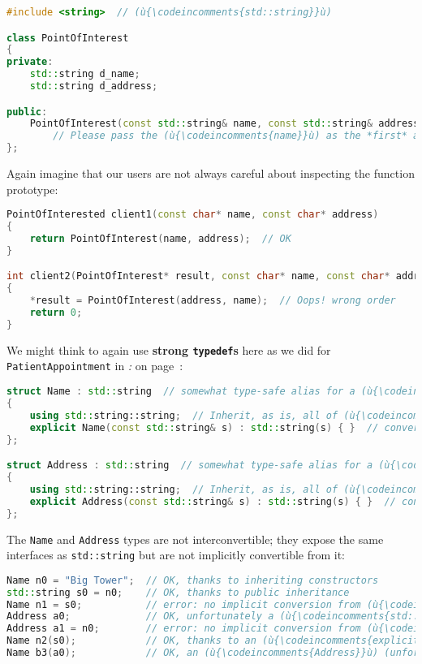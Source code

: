 \begin{lstlisting}[language=C++]
#include <string>  // (ù{\codeincomments{std::string}}ù)

class PointOfInterest
{
private:
    std::string d_name;
    std::string d_address;

public:
    PointOfInterest(const std::string& name, const std::string& address);
        // Please pass the (ù{\codeincomments{name}}ù) as the *first* and the (ù{\codeincomments{address}}ù) *second*!
};
\end{lstlisting}

\noindent Again imagine that our users are not always careful about inspecting the
function prototype:

\begin{lstlisting}[language=C++]
PointOfInterested client1(const char* name, const char* address)
{
    return PointOfInterest(name, address);  // OK
}

int client2(PointOfInterest* result, const char* name, const char* address)
{
    *result = PointOfInterest(address, name);  // Oops! wrong order
    return 0;
}
\end{lstlisting}

\noindent We might think to again use \textbf{strong \texttt{typedef}s} here as we
did for \texttt{PatientAppointment} in \textit{: } on page~\pageref{implementing-a-strong-typedef}:

\begin{lstlisting}[language=C++]
struct Name : std::string  // somewhat type-safe alias for a (ù{\codeincomments{std::string}}ù)
{
    using std::string::string;  // Inherit, as is, all of (ù{\codeincomments{std::string}}ù)'s ctors.
    explicit Name(const std::string& s) : std::string(s) { }  // conversion
};

struct Address : std::string  // somewhat type-safe alias for a (ù{\codeincomments{std::string}}ù)
{
    using std::string::string;  // Inherit, as is, all of (ù{\codeincomments{std::string}}ù)'s ctors.
    explicit Address(const std::string& s) : std::string(s) { }  // conversion
};
\end{lstlisting}

\noindent The \texttt{Name} and \texttt{Address} types are not interconvertible; they expose the same interfaces as \texttt{std::string} but are not
implicitly convertible from it:

\begin{lstlisting}[language=C++]
Name n0 = "Big Tower";  // OK, thanks to inheriting constructors
std::string s0 = n0;    // OK, thanks to public inheritance
Name n1 = s0;           // error: no implicit conversion from (ù{\codeincomments{std::string}}ù)
Address a0;             // OK, unfortunately a (ù{\codeincomments{std::string}}ù) has a default ctor.
Address a1 = n0;        // error: no implicit conversion from (ù{\codeincomments{Name}}ù)
Name n2(s0);            // OK, thanks to an (ù{\codeincomments{explicit}}ù) constructor in (ù{\codeincomments{Name}}ù)
Name b3(a0);            // OK, an (ù{\codeincomments{Address}}ù) (unfortunately) is a (ù{\codeincomments{std::string}}ù).
\end{lstlisting}

